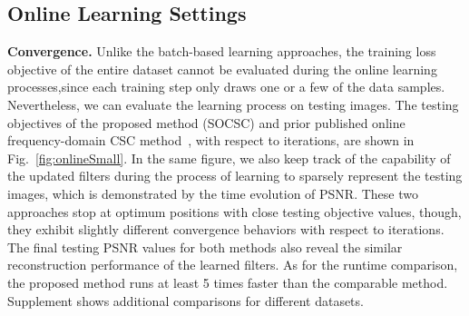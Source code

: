 \subsection{Online Learning Settings}

{\bfseries Convergence.} Unlike the batch-based learning approaches, the training loss objective of the entire dataset cannot be evaluated during the online learning processes,since each training step only draws one or a few of the data samples. Nevertheless, we can evaluate the learning process on testing images. The testing objectives of the proposed method (SOCSC) and prior published online frequency-domain CSC method~\cite{liu-2018-first}, with respect to iterations, are shown in Fig.\ \ref{fig:onlineSmall}. In the same figure, we also keep track of the capability of the updated filters during the process of learning to sparsely represent the testing images, which is demonstrated by the time evolution of PSNR. These two approaches stop at optimum positions with close testing objective values, though, they exhibit slightly different convergence behaviors with respect to iterations. The final testing PSNR values for both methods also reveal the similar reconstruction performance of the learned filters. As for the runtime comparison, the proposed method runs at least 5 times faster than the comparable method. Supplement shows additional comparisons for different datasets.


